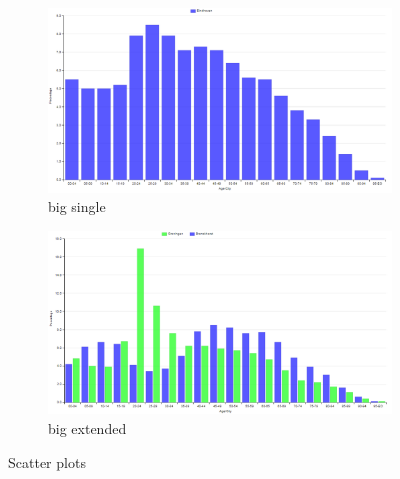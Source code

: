 \documentclass[a4paper,twoside,11pt]{article}
\begin{document}
\begin{figure}
\begin{subfigure}[b]{0.23\textwidth}
                \label{fig:smallExtended}
        \end{subfigure}
        \begin{subfigure}[b]{0.23\textwidth}
                \includegraphics[width=\textwidth]{Visualization/BarChartExtendedSingle.png}
                \caption{big single}
                \label{fig:bigSingle}
        \end{subfigure}
        \begin{subfigure}[b]{0.23\textwidth}
                \includegraphics[width=\textwidth]{Visualization/BarChartExtendedFull.png}
                \caption{big extended}
                \label{fig:bigExtended}
        \end{subfigure}
        \caption{Scatter plots}\label{fig:BarCharts}
\end{figure}
\newline
\newline
\newline
\newline
\newline
\newline
\newline
\newline
\end{document}
